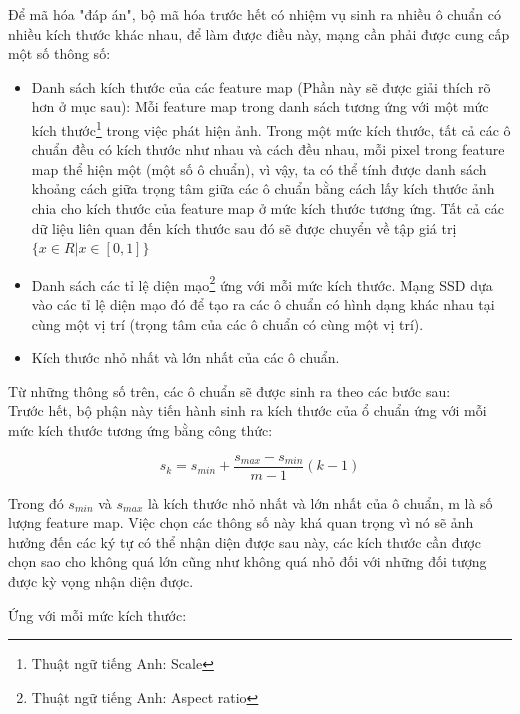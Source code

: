\documentclass[a4paper,12pt]{article}
\begin{document}
	Để mã hóa "đáp án", bộ mã hóa trước hết có nhiệm vụ sinh ra nhiều ô chuẩn có nhiều kích thước khác nhau, để làm được điều này, mạng cần phải được cung cấp một số thông số:\\
	\begin{itemize}
		\item Danh sách kích thước của các feature map (Phần này sẽ được giải thích rõ hơn ở mục sau): Mỗi feature map trong danh sách tương ứng với một mức kích thước\footnote{Thuật ngữ tiếng Anh: Scale} trong việc phát hiện ảnh. Trong một mức kích thước, tất cả các ô chuẩn đều có kích thước như nhau và cách đều nhau, mỗi pixel trong feature map thể hiện một (một số ô chuẩn), vì vậy, ta có thể tính được danh sách khoảng cách giữa trọng tâm giữa các ô chuẩn bằng cách lấy kích thước ảnh chia cho kích thước của feature map ở mức kích thước tương ứng. Tất cả các dữ liệu liên quan đến kích thước sau đó sẽ được chuyển về tập giá trị $\{x \in R | x \in [0, 1] \} $ 
		\item Danh sách các tỉ lệ diện mạo\footnote{Thuật ngữ tiếng Anh: Aspect ratio} ứng với mỗi mức kích thước. Mạng SSD dựa vào các tỉ lệ diện mạo đó để tạo ra các ô chuẩn có hình dạng khác nhau tại cùng một vị trí (trọng tâm của các ô chuẩn có cùng một vị trí).
		\item Kích thước nhỏ nhất và lớn nhất của các ô chuẩn.
	\end{itemize} 
	
	Từ những thông số trên, các ô chuẩn sẽ được sinh ra theo các bước sau: \\
	Trước hết, bộ phận này tiến hành sinh ra kích thước của ổ chuẩn ứng với mỗi mức kích thước tương ứng bằng công thức: 
	
	$$s_k = s_{min} + \frac{s_{max} - s_{min}}{m - 1}(k - 1) $$
	
	Trong đó $s_{min}$ và $s_{max}$ là kích thước nhỏ nhất và lớn nhất của ô chuẩn, m là số lượng feature map. Việc chọn các thông số này khá quan trọng vì nó sẽ ảnh hưởng đến các ký tự có thể nhận diện được sau này, các kích thước cần được chọn sao cho không quá lớn cũng như không quá nhỏ đối với những đối tượng được kỳ vọng nhận diện được.
	
	Ứng với mỗi mức kích thước:
	
\end{document}
